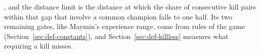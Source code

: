 \cite{halfaker2015session}, and the distance limit is the distance at which the share of consecutive
kill pairs within that gap that involve a common champion falls to one half. Its two remaining gates,
like Maymin's experience range, come from rules of the game (Section~\ref{sec:def-constants}), and
Section~\ref{sec:def-killless} measures what requiring a kill misses.

